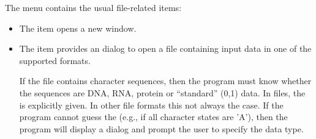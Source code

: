 \documentclass[11pt]{article}
\begin{document}
The  menu contains the usual file-related items:
\begin{itemize}
\item
The  item opens a new  window.
\item
The  item provides an  dialog
to open a file containing input data in one of the supported formats.

If the file contains character sequences, then the program must know whether
the sequences are DNA, RNA, protein or ``standard'' (0,1) data.
In  files, the  is explicitly given.
In other file formats
this not always the case. If the program cannot guess the 
(e.g., if all character states are 'A'), then the program will display
a  dialog and prompt the user to specify the data
type.


\end{itemize}
\end{document}
